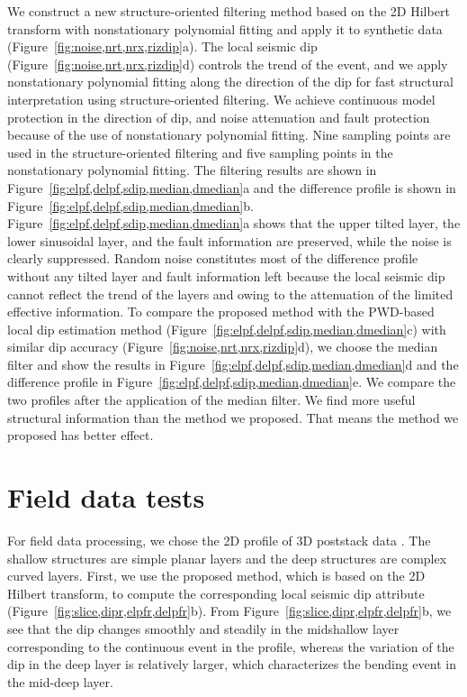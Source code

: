 We construct a new structure-oriented filtering method based on the 2D
Hilbert transform with nonstationary polynomial fitting and apply it
to synthetic data (Figure~\ref{fig:noise,nrt,nrx,rizdip}a).  The local
seismic dip (Figure~\ref{fig:noise,nrt,nrx,rizdip}d) controls the
trend of the event, and we apply nonstationary polynomial fitting
along the direction of the dip for fast structural interpretation
using structure-oriented filtering. We achieve continuous model
protection in the direction of dip, and noise attenuation and fault
protection because of the use of nonstationary polynomial
fitting. Nine sampling points are used in the structure-oriented
filtering and five sampling points in the nonstationary polynomial
fitting. The filtering results are shown in
Figure~\ref{fig:elpf,delpf,sdip,median,dmedian}a and the difference
profile is shown in Figure~\ref{fig:elpf,delpf,sdip,median,dmedian}b.
Figure~\ref{fig:elpf,delpf,sdip,median,dmedian}a shows that the upper
tilted layer, the lower sinusoidal layer, and the fault information
are preserved, while the noise is clearly suppressed. Random noise
constitutes most of the difference profile without any tilted layer
and fault information left because the local seismic dip cannot
reflect the trend of the layers and owing to the attenuation of the
limited effective information. To compare the proposed method with the
PWD-based local dip estimation method
(Figure~\ref{fig:elpf,delpf,sdip,median,dmedian}c) with similar dip
accuracy (Figure~\ref{fig:noise,nrt,nrx,rizdip}d), we choose the
median filter and show the results in
Figure~\ref{fig:elpf,delpf,sdip,median,dmedian}d and the difference
profile in Figure~\ref{fig:elpf,delpf,sdip,median,dmedian}e. We
compare the two profiles after the application of the median
filter. We find more useful structural information than the method we
proposed.  That means the method we proposed has better effect.

\section{Field data tests}

For field data processing, we chose the 2D profile of 3D poststack
data \cite[]{Liu13}. The shallow structures are simple planar layers
and the deep structures are complex curved layers. First, we use the
proposed method, which is based on the 2D Hilbert transform, to
compute the corresponding local seismic dip attribute
(Figure~\ref{fig:slice,dipr,elpfr,delpfr}b). From
Figure~\ref{fig:slice,dipr,elpfr,delpfr}b, we see that the dip changes
smoothly and steadily in the midshallow layer corresponding to the
continuous event in the profile, whereas the variation of the dip in
the deep layer is relatively larger, which characterizes the bending
event in the mid-deep layer.  

